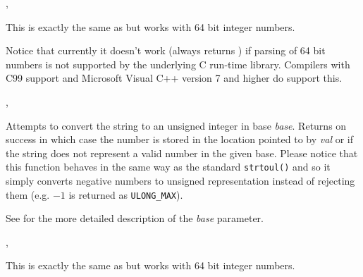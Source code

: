 
,\\


\label{wxstringtolonglong}


This is exactly the same as  but works with 64
bit integer numbers.

Notice that currently it doesn't work (always returns \false) if parsing of 64
bit numbers is not supported by the underlying C run-time library. Compilers
with C99 support and Microsoft Visual C++ version 7 and higher do support this.


,\\


\label{wxstringtoulong}


Attempts to convert the string to an unsigned integer in base {\it base}.
Returns \true on success in which case the number is stored in the
location pointed to by {\it val} or \false if the string does not
represent a valid number in the given base. Please notice that this function
behaves in the same way as the standard \texttt{strtoul()} and so it simply
converts negative numbers to unsigned representation instead of rejecting them
(e.g. $-1$ is returned as \texttt{ULONG\_MAX}).

See  for the more detailed
description of the {\it base} parameter.


,\\


\label{wxstringtoulonglong}


This is exactly the same as  but works with 64
bit integer numbers.

